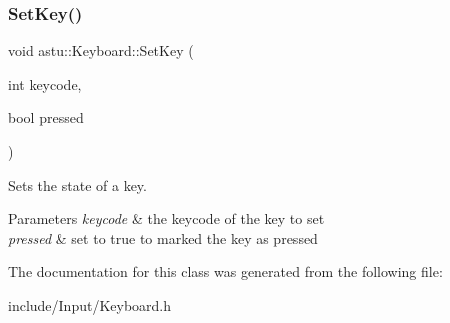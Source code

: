\subsubsection{\texorpdfstring{Set\+Key()}{SetKey()}}
{\footnotesize\ttfamily void astu\+::\+Keyboard\+::\+Set\+Key (\begin{DoxyParamCaption}\item[{int}]{keycode,  }\item[{bool}]{pressed }\end{DoxyParamCaption})}

Sets the state of a key.


\begin{DoxyParams}{Parameters}
{\em keycode} & the keycode of the key to set \\
\hline
{\em pressed} & set to {\ttfamily true} to marked the key as pressed \\
\hline
\end{DoxyParams}


The documentation for this class was generated from the following file\+:\begin{DoxyCompactItemize}
\item 
include/\+Input/Keyboard.\+h\end{DoxyCompactItemize}
